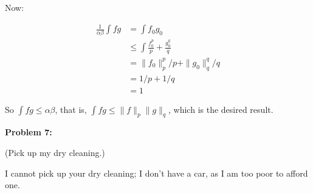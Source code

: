 \documentclass[a4paper,12pt]{article}
\newcommand{\shunt}{\vspace{20mm}}
\newcommand{\norm}[1]{\|#1\|}
\newcommand{\al}{\alpha} %
\newcommand{\be}{\beta}
\begin{document}
Now:

\begin{align*}
\frac{1}{\al \be} \int fg &= \int f_0 g_0 \\
&\leq \int \frac{f_0^p}{p} + \frac{g_0^q}{q}\\
&= \norm{f_0}_p^p/p + \norm{g_0}_q^q/q\\
&= 1/p + 1/q\\
&=1
\end{align*}

So $\int fg \leq \al \be$, that is, $\int fg \leq \norm{f}_p\norm{g}_q$, which is the desired result.

\shunt

{\bf Problem 7:}

(Pick up my dry cleaning.)

I cannot pick up your dry cleaning; I don't have a car, as I am too poor to afford one.

\shunt
\end{document}
